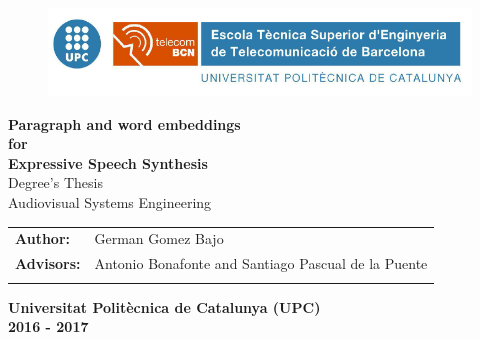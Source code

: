 \documentclass[11pt,a4paper]{report}
\author{German Gomez Bajo}
\begin{document}
\begin{titlepage}

	\begin{center}
		\begin{figure}[htb]
		\centering
			\includegraphics[width=1\textwidth]{figures/logo_upc.png}
		\end{figure}

		\vspace{1cm}


                \textbf{ \Huge Paragraph and word embeddings \\ \vspace{0.3cm} for \\ \vspace{0.5cm} Expressive Speech Synthesis} \\ %
		\vspace*{0.3in}
		\vspace*{0.1in}
		{\Large  Degree's Thesis \\Audiovisual Systems Engineering }\\
		\vspace{5cm}
		\begin{tabular}{ll}

			\large{\textbf{Author:}}	&
			\large{German Gomez Bajo} \\

			\large{\textbf{Advisors:}}	&
			\large{Antonio Bonafonte and Santiago Pascual de la Puente} \\	
			\vspace{1cm}
		\end{tabular}

		\large{\textbf{Universitat Politècnica de Catalunya (UPC)}}\\
		\large{\textbf{2016 - 2017}}\\
	\end{center}
\end{titlepage}
\end{document}
